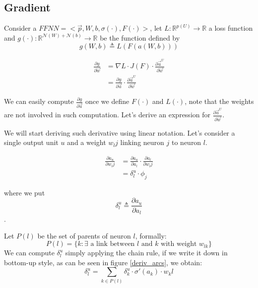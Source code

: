 \subsection{Gradient}
Consider a $FFNN=<\vec{p},W,b,\sigma(\cdot),F(\cdot)>$, let $L:\mathbb{R}^{p(U)} \rightarrow \mathbb{R}$ a loss function and 
$g(\cdot):\mathbb{R}^{\mathcal{N}(W)+\mathcal{N}(b)} \rightarrow \mathbb{R}$ be the function defined by
$$g(W,b) \triangleq L(F(a(W,b)))$$

\begin{equation}
\begin{align}
\frac{\partial g}{\partial \vec{w}} &= \nabla L \cdot J(F) \cdot \frac{\partial \vec{a}^U}{\partial \vec{w}}\\
&= \frac{\partial g}{\partial \vec{a}} \cdot \frac{\partial \vec{a}^U}{\partial \vec{w}}
\end{align}
\end{equation}

We can easily compute $\frac{\partial g}{\partial \vec{a}}$ once we define $F(\cdot)$ and $L(\cdot)$, note that the weights are not involved in such computation.
Let's derive an expression for $\frac{\partial \vec{a}^U}{\partial \vec{w}}$.

We will start deriving such derivative using linear notation. Let's consider a single output unit $u$ and a weight $w_lj$ linking neuron $j$ to neuron $l$.

\begin{equation}
\begin{align}
\frac{\partial a_u}{\partial w_lj} &= \frac{\partial a_u}{\partial a_l} \cdot \frac{\partial a_l}{\partial w_lj}\\
&=\delta_l^u \cdot \phi_j
\end{align}
\end{equation}

where we put $$\delta_l^u \triangleq \frac{\partial a_u}{\partial a_l}$$.

Let $P(l)$ be the set of parents of neuron $l$, formally:
\begin{equation} 
P(l) = \{ k: \exists \text{ a link between $l$ and $k$ with weight } w_{lk} \}
\end{equation}
We can compute $\delta_l^u$ simply applying the chain rule, if we write it down in bottom-up style, as can be seen in figure \ref{deriv_arcs}, we obtain:
\begin{equation}
\delta_l^u = \sum_{k\in P(l)} \delta_k^u \cdot \sigma'(a_k)\cdot w_kl
\end{equation}

